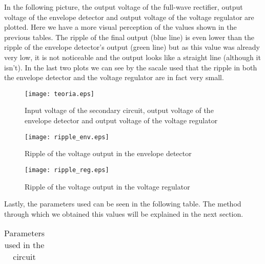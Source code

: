 \par In the following picture, the output voltage of the full-wave rectifier, output voltage of the envelope detector and output voltage of the voltage regulator are plotted. Here we have a more visual perception of the values shown in the previous tables. The ripple of the final output (blue line) is even lower than the ripple of the envelope detector's output (green line) but as this value was already very low, it is not noticeable and the output looks like a straight line (although it isn't). In the last two plots we can see by the sacale used that the ripple in both the envelope detector and the voltage regulator are in fact very small.

\begin{figure}[h!] \centering
\texttt{[image: teoria.eps]}
\caption{Input voltage of the secondary circuit, output voltage of the envelope detector and output voltage of the voltage regulator}
\end{figure}

\begin{figure}[h!] \centering
\texttt{[image: ripple\_env.eps]}
\caption{Ripple of the voltage output in the envelope detector}
\end{figure}

\begin{figure}[h!] \centering
\texttt{[image: ripple\_reg.eps]}
\caption{Ripple of the voltage output in the voltage regulator}
\end{figure}


\par Lastly, the parameters used can be seen in the following table. The method through which we obtained this values will be explained in the next section.

\vspace{5mm}
\begin{table}[h!]
\centering
\begin{tabularx}{0.9\textwidth} {
  | >{\raggedright\arraybackslash}X
  | >{\raggedleft\arraybackslash}X | }
 \hline

\end{tabularx}
\caption{\label{tab:Table 3} Parameters used in the circuit}
\end{table}
\vspace{5mm}
	


